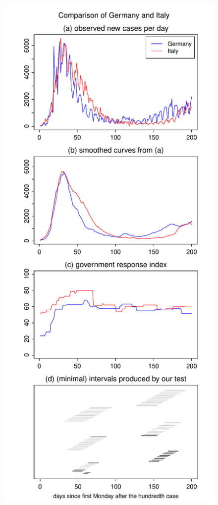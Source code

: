 \documentclass[a4paper,12pt]{article}
\numberwithin{equation}{section}
\begin{document}
\begin{figure}[h!]
\begin{minipage}[t]{0.49\textwidth}
\includegraphics[width=\textwidth]{plots/DEU_vs_ITA_four_countries}

\end{minipage}
\end{figure}
\end{document}
